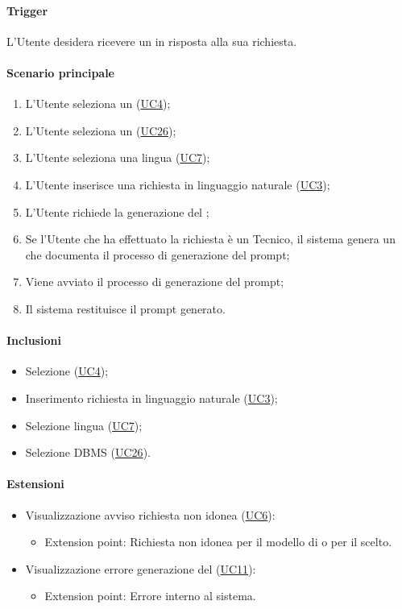 \paragraph*{Trigger}
L'Utente desidera ricevere un  in risposta alla sua richiesta.

\paragraph*{Scenario principale}
\begin{enumerate}
  \item L'Utente seleziona un (\hyperref[UC4]{UC4});
  \item L'Utente seleziona un  (\hyperref[UC26]{UC26});
  \item L'Utente seleziona una lingua (\hyperref[UC7]{UC7});
  \item L'Utente inserisce una richiesta in linguaggio naturale (\hyperref[UC3]{UC3});
  \item L'Utente richiede la generazione del ;
  \item Se l'Utente che ha effettuato la richiesta è un Tecnico, il sistema genera un  che documenta il processo di generazione del prompt;
  \item Viene avviato il processo di generazione del prompt;
  \item Il sistema restituisce il prompt generato.
\end{enumerate}

\paragraph*{Inclusioni}
\begin{itemize}
  \item Selezione  (\hyperref[UC4]{UC4});
  \item Inserimento richiesta in linguaggio naturale (\hyperref[UC3]{UC3});
  \item Selezione lingua (\hyperref[UC7]{UC7});
  \item Selezione DBMS (\hyperref[UC26]{UC26}).
\end{itemize}

\paragraph*{Estensioni}
\begin{itemize}
  \item Visualizzazione avviso richiesta non idonea (\hyperref[UC6]{UC6}):
  \begin{itemize}
    \item Extension point: Richiesta non idonea per il modello di  o per il  scelto.
  \end{itemize}
  \item Visualizzazione errore generazione del  (\hyperref[UC11]{UC11}):
    \begin{itemize}
      \item Extension point: Errore interno al sistema.
    \end{itemize}
\end{itemize}